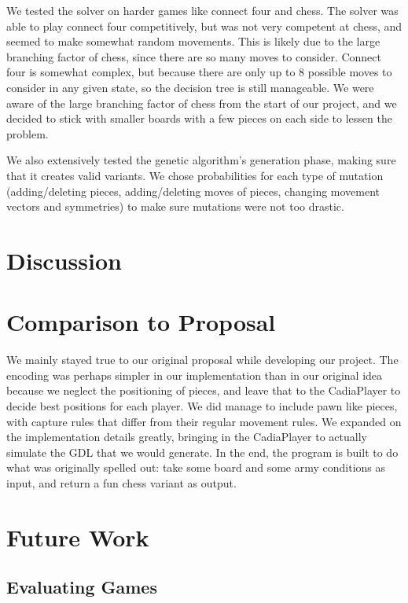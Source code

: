 \documentclass[11pt,letterpaper]{article}
\begin{document}
We tested the solver on harder games like connect four and chess. The solver was able to play connect four competitively, but was not very competent at chess, and seemed to make somewhat random movements. This is likely due to the large branching factor of chess, since there are so many moves to consider. Connect four is somewhat complex, but because there are only up to 8 possible moves to consider in any given state, so the decision tree is still manageable. We were aware of the large branching factor of chess from the start of our project, and we decided to stick with smaller boards with a few pieces on each side to lessen the problem.

We also extensively tested the genetic algorithm's generation phase, making sure that it creates valid variants. We chose probabilities for each type of mutation (adding/deleting pieces, adding/deleting moves of pieces, changing movement vectors and symmetries) to make sure mutations were not too drastic.

\section{Discussion}


\section{Comparison to Proposal}
We mainly stayed true to our original proposal while developing our project. The encoding was perhaps simpler in our implementation than in our original idea because we neglect the positioning of pieces, and leave that to the CadiaPlayer to decide best positions for each player. We did manage to include pawn like pieces, with capture rules that differ from their regular movement rules. We expanded on the implementation details greatly, bringing in the CadiaPlayer to actually simulate the GDL that we would generate. In the end, the program is built to do what was originally spelled out: take some board and some army conditions as input, and return a fun chess variant as output.

\section{Future Work}

\subsection{Evaluating Games}
\end{document}
